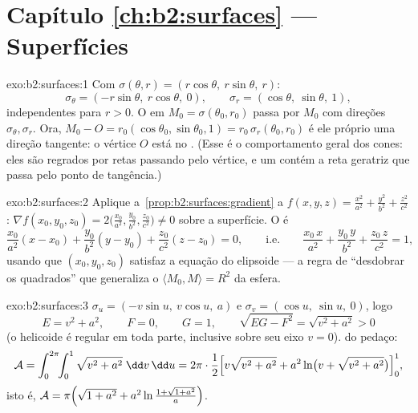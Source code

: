 \section*{Capítulo \ref{ch:b2:surfaces} --- Superfícies}

\begin{solution}{exo:b2:surfaces:1}
Com $\sigma(\theta, r) = (r\cos\theta,\ r\sin\theta,\ r)$:
\[
\sigma_\theta = (-r\sin\theta,\ r\cos\theta,\ 0),
\qquad
\sigma_r = (\cos\theta,\ \sin\theta,\ 1),
\]
independentes para $r > 0$. O  em $M_0 =
\sigma(\theta_0, r_0)$ passa por $M_0$ com direções
$\sigma_\theta, \sigma_r$. Ora, $M_0 - O = r_0(\cos\theta_0,
\sin\theta_0, 1) = r_0\,\sigma_r(\theta_0, r_0)$ é ele próprio uma
direção tangente: o vértice $O$ está no . (Esse
é o comportamento geral dos cones: eles são regrados por retas passando pelo
vértice, e um  contém a reta geratriz que passa pelo
ponto de tangência.)
\end{solution}

\begin{solution}{exo:b2:surfaces:2}
Aplique a~\cref{prop:b2:surfaces:gradient} a $f(x,y,z) =
\frac{x^2}{a^2} + \frac{y^2}{b^2} + \frac{z^2}{c^2}$: $\nabla
f(x_0,y_0,z_0) = 2\bigl(\frac{x_0}{a^2}, \frac{y_0}{b^2},
\frac{z_0}{c^2}\bigr) \neq 0$ sobre a superfície. O  é
\[
\frac{x_0}{a^2}(x - x_0) + \frac{y_0}{b^2}(y - y_0)
+ \frac{z_0}{c^2}(z - z_0) = 0,
\qquad\text{i.e.}\qquad
\frac{x_0\,x}{a^2} + \frac{y_0\,y}{b^2} + \frac{z_0\,z}{c^2} = 1,
\]
usando que $(x_0, y_0, z_0)$ satisfaz a equação do elipsoide ---
a regra de ``desdobrar os quadrados'' que generaliza o $\langle
M_0, M \rangle = R^2$ da esfera.
\end{solution}

\begin{solution}{exo:b2:surfaces:3}
$\sigma_u = (-v\sin u,\ v\cos u,\ a)$ e $\sigma_v = (\cos u,\
\sin u,\ 0)$, logo
\[
E = v^2 + a^2, \qquad F = 0, \qquad G = 1,
\qquad
\sqrt{EG - F^2} = \sqrt{v^2 + a^2} > 0
\]
(o helicoide é regular em toda parte, inclusive sobre seu eixo $v =
0$). \omterm{def:b2:surfaces:area}{Área} do pedaço:
\[
\mathcal{A} = \int_0^{2\pi}\!\!\int_0^1
\sqrt{v^2 + a^2}\;\dd v\,\dd u
= 2\pi\cdot\frac12\Bigl[v\sqrt{v^2 + a^2}
+ a^2\ln\bigl(v + \sqrt{v^2 + a^2}\bigr)\Bigr]_0^1 ,
\]
isto é, $\mathcal{A} = \pi\Bigl(\sqrt{1 + a^2} +
a^2\ln\frac{1 + \sqrt{1 + a^2}}{a}\Bigr)$.
\end{solution}

